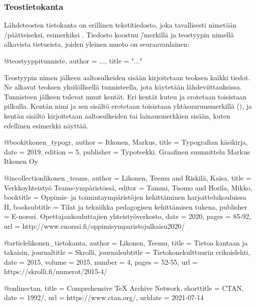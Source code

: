 \subsubsection{Teostietokanta}

Lähdeteosten tietokanta on erillinen tekstitiedosto, joka tavallisesti
nimetään \-/päätteiseksi, esimerkiksi .
Tiedosto koostuu \=/merkillä ja teostyypin nimellä alkavista
tietueista, joiden yleinen muoto on seuraavanlainen:

\begin{koodilohkosis}
@teostyyppi{tunniste,
  author = {...},
  title  = "..."
}
\end{koodilohkosis}

\noindent
Teostyypin nimen jälkeen aaltosulkeiden sisään kirjoitetaan teoksen
kaikki tiedot. Ne alkavat teoksen yksilöllisellä tunnisteella, jota
käytetään lähdeviittauksissa. Tunnisteen jälkeen tulevat muut kentät.
Eri kentät kuten  ja  erotetaan toisistaan
pilkulla. Kentän nimi ja sen sisältö erotetaan toisistaan
yhtäsuuruusmerkillä (\koodi{=}), ja kentän sisältö kirjoitetaan
aaltosulkeiden tai lainausmerkkien sisään, kuten edellinen esimerkki
näyttää.

\begin{esimerkki*}
\begin{koodilohko}
@book{itkonen_typogr,
  author = {Itkonen, Markus},
  title = {Typografian käsikirja},
  date = {2019},
  edition = {5},
  publisher = {Typoteekki. Graafinen suunnittelu Markus Itkonen Oy}
}

@incollection{likonen_teams,
  author = {Likonen, Teemu and Riskilä, Kaisa},
  title = {Verkkoyhteistyö Teams-ympäristössä},
  editor = {Tammi, Tuomo and Horila, Mikko},
  booktitle = {Oppimis- ja toimintaympäristöjen kehittäminen
    harjoittelukouluissa II},
  booksubtitle = {Tilat ja tekniikka pedagogisen kehittämisen tukena},
  publisher = {E-norssi. Opettajankouluttajien yhteistyöverkosto},
  date = {2020},
  pages = {85-92},
  url = {http://www.enorssi.fi/oppimisymparistojulkaisu2020/}
}

@article{likonen_tietokanta,
  author = {Likonen, Teemu},
  title = {Tietoa kantaan ja takaisin},
  journaltitle = {Skrolli},
  journalsubtitle = {Tietokonekulttuurin erikoislehti},
  date = {2015},
  volume = {2015},
  number = {4},
  pages = {52-55},
  url = {https://skrolli.fi/numerot/2015-4/}
}

@online{ctan,
  title = {Comprehensive TeX Archive Network},
  shorttitle = {CTAN},
  date = {1992/},
  url = {https://www.ctan.org/},
  urldate = {2021-07-14}
}
\end{koodilohko}
  \caption{Lähdeteosten tietokantatiedosto}
  \label{esim/bib-tiedosto}
\end{esimerkki*}

